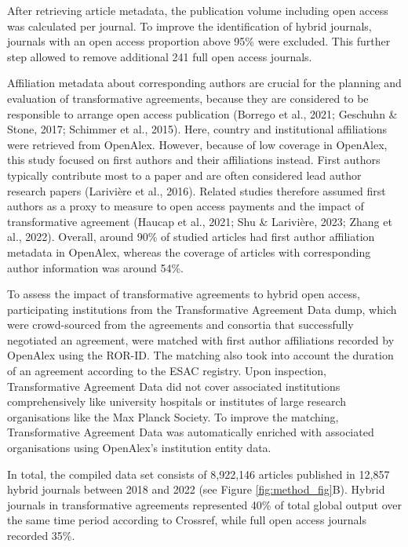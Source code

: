 \documentclass[a4paper,man,floatsintext,longtable,noextraspace,12pt]{apa6}
\begin{document}
After retrieving article metadata, the publication volume including open
access was calculated per journal. To improve the identification of
hybrid journals, journals with an open access proportion above 95\% were
excluded. This further step allowed to remove additional 241 full open
access journals.

Affiliation metadata about corresponding authors are crucial for the
planning and evaluation of transformative agreements, because they are
considered to be responsible to arrange open access publication (Borrego
et al., 2021; Geschuhn \& Stone, 2017; Schimmer et al., 2015). Here,
country and institutional affiliations were retrieved from OpenAlex.
However, because of low coverage in OpenAlex, this study focused on
first authors and their affiliations instead. First authors typically
contribute most to a paper and are often considered lead author research
papers (Larivière et al., 2016). Related studies therefore assumed first
authors as a proxy to measure to open access payments and the impact of
transformative agreement (Haucap et al., 2021; Shu \& Larivière, 2023;
Zhang et al., 2022). Overall, around 90\% of studied articles had first
author affiliation metadata in OpenAlex, whereas the coverage of
articles with corresponding author information was around 54\%.

To assess the impact of transformative agreements to hybrid open access,
participating institutions from the Transformative Agreement Data dump,
which were crowd-sourced from the agreements and consortia that
successfully negotiated an agreement, were matched with first author
affiliations recorded by OpenAlex using the ROR-ID. The matching also
took into account the duration of an agreement according to the ESAC
registry. Upon inspection, Transformative Agreement Data did not cover
associated institutions comprehensively like university hospitals or
institutes of large research organisations like the Max Planck Society.
To improve the matching, Transformative Agreement Data was automatically
enriched with associated organisations using OpenAlex's institution
entity data.

In total, the compiled data set consists of 8,922,146 articles published
in 12,857 hybrid journals between 2018 and 2022 (see Figure
\ref{fig:method_fig}B). Hybrid journals in transformative agreements
represented 40\% of total global output over the same time period
according to Crossref, while full open access journals recorded 35\%.
\end{document}
